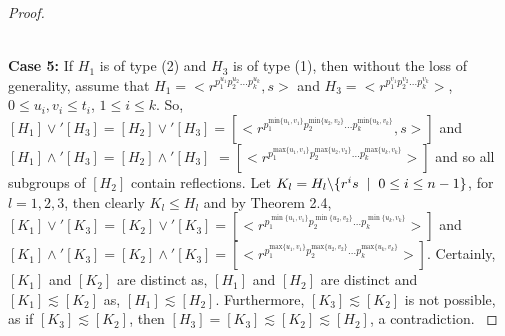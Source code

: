 \documentclass{article}
\theoremstyle{definition}
\begin{document}
\begin{proof}
\begin{figure}[h!]
        \caption{}
\end{figure}\\
\textbf{Case 5:} If $H_1$ is of type (2) and $H_3$ is of type (1), then without the loss of generality, assume that $H_1=\bigl<r^{p_1^{u_1}p_2^{u_2}\dots p_k^{u_k}},s\bigr>$ and $H_3=$$\bigl<r^{p_1^{v_1}p_2^{v_2}\dots p_k^{v_k}}\bigr>$, $0\le u_i,v_i\le t_i$, $1\le i\le k$. So, $[H_1]\vee' [H_3]=[H_2]\vee' [H_3]= [\bigl<r^{p_1^{\text{min}\{u_1,v_1\}}p_2^{\text{min}\{u_2,v_2\}}\dots p_k^{\text{min}\{u_k,v_k\}}},s\bigr>]$ and $[H_1]\wedge' [H_3]=[H_2]\wedge' [H_3]$ $=[\bigl<r^{p_1^{\text{max}\{u_1,v_1\}}p_2^{\text{max}\{u_2,v_2\}}\dots p_k^{\text{max}\{u_k,v_k\}}}\bigr>]$ and so all subgroups of $[H_2]$ contain reflections. Let $K_l=H_l \backslash \{r^is\hspace{0.2cm}|\hspace{0.2cm}0\le i\le n-1\} $, for $l=1,2,3$, then clearly $K_l\le H_l$ and by Theorem 2.4, $[K_1]\vee' [K_3]=[K_2]\vee'[K_3]=[\bigl<r^{p_1^{\min\{u_1,v_1\}}p_2^{\min\{u_2,v_2\}}\dots p_k^{\min\{u_k,v_k\}}}\bigr>]$ and $[K_1]\wedge' [K_3]=[K_2]\wedge'[K_3]=[\bigl<r^{p_1^{\text{max}\{u_1,v_1\}}p_2^{\text{max}\{u_2,v_2\}}\dots p_k^{\text{max}\{u_k,v_k\}}}\bigr>]$. Certainly, $[K_1]$ and $[K_2]$ are distinct as, $[H_1]$ and $[H_2]$ are distinct and $[K_1]\lesssim [K_2]$ as, $[H_1]\lesssim [H_2]$. Furthermore, $[K_3]\lesssim[K_2]$ is not possible, as if $[K_3]\lesssim[K_2]$, then $[H_3]=[K_3]\lesssim [K_2]\lesssim [H_2]$, a contradiction.
$$
\end{proof}
\end{document}
